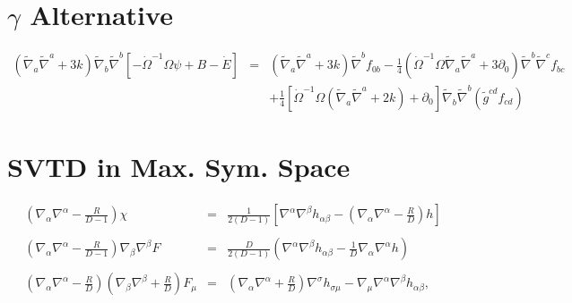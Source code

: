 \documentclass[10pt,letterpaper]{article}
\numberwithin{equation}{section}
\begin{document}
\newpage
\begin{appendices}
\section{$\gamma$ Alternative}
\begin{eqnarray}
(\tilde\nabla_a\tilde\nabla^a + 3k)\tilde\nabla_b\tilde\nabla^b[ -\dot\Omega^{-1}\Omega \psi+ B-\dot E] &=& 
(\tilde\nabla_a\tilde\nabla^a + 3k)\tilde\nabla^b f_{0b}
-\tfrac14 (\dot\Omega^{-1}\Omega\tilde\nabla_a\tilde\nabla^a+3\partial_0)\tilde\nabla^b\tilde\nabla^c f_{bc}
\nonumber\\
&& +\tfrac14\left[\dot\Omega^{-1}\Omega (\tilde\nabla_a\tilde\nabla^a +2k) + \partial_0\right]\tilde\nabla_b\tilde\nabla^b (\tilde g^{cd}f_{cd})
\end{eqnarray}

\section{SVTD in Max. Sym. Space}
\begin{eqnarray}
\left( \nabla_\alpha\nabla^\alpha -\frac{R}{D-1}\right)\chi &=& \frac{1}{2(D-1)}\left[ \nabla^\alpha\nabla^\beta h_{\alpha\beta}  -\left(\nabla_\alpha\nabla^\alpha - \frac{R}{D}\right)h\right]
\\ \nonumber\\
\left(\nabla_\alpha\nabla^\alpha - \frac{R}{D-1}\right) \nabla_\beta\nabla^\beta F &=& \frac{D}{2(D-1)}\left( \nabla^\alpha\nabla^\beta h_{\alpha\beta}  - \frac{1}{D}\nabla_\alpha\nabla^\alpha h\right)
\\ \nonumber\\
\left(\nabla_\alpha\nabla^\alpha - \frac{R}{D}\right)\left(\nabla_\beta\nabla^\beta + \frac{R}{D}\right) F_\mu
&=& \left(\nabla_\alpha\nabla^\alpha+\frac{R}{D}\right)\nabla^\sigma h_{\sigma\mu} - \nabla_\mu \nabla^\alpha\nabla^\beta h_{\alpha\beta},
\end{eqnarray}
\end{appendices}
\end{document}
